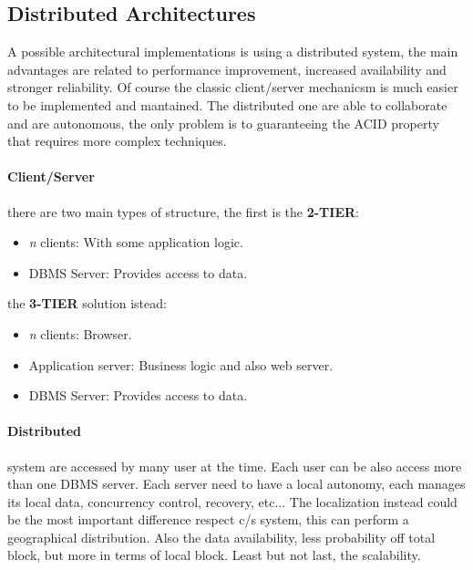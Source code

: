 \documentclass[12pt]{article}
\begin{document}
\subsection{Distributed Architectures}
A possible architectural implementations is using a distributed system, the main advantages are related to performance improvement, increased availability and stronger reliability. Of course the classic client/server mechanicsm is much easier to be implemented and mantained. The distributed one are able to collaborate and are autonomous, the only problem is to guaranteeing the ACID property that requires more complex techniques.\\
\paragraph{Client/Server} there are two main types of structure, the first is the \textbf{2-TIER}:
\begin{itemize}
  \item \textit{n} clients: With some application logic.
  \item DBMS Server: Provides access to data.
\end{itemize}
the \textbf{3-TIER} solution istead:
\begin{itemize}
  \item \textit{n} clients: Browser.
  \item Application server: Business logic and also web server.
  \item DBMS Server: Provides access to data.
\end{itemize}

\paragraph{Distributed} system are accessed by many user at the time. Each user can be also access more than one DBMS server. Each server need to have a local autonomy, each manages its local data, concurrency control, recovery, etc... The localization instead could be the most important difference respect c/s system, this can perform a geographical distribution. Also the data availability, less probability off total block, but more in terms of local block. Least but not last, the scalability.
\end{document}
